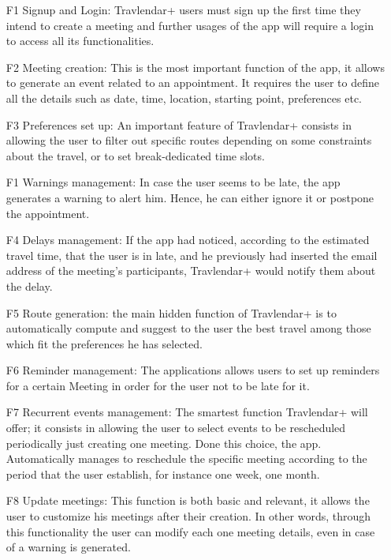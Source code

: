 
\begin{itemize}

\item[\hypertarget{F1}{F1}] Signup and Login: Travlendar+ users must sign up the first time they intend to create a meeting and further usages of the app will require a login to access all its functionalities.
\item[\hypertarget{F2}{F2}] Meeting creation: This is the most important function of the app, it allows to generate an event related to an appointment. It requires the user to define all the details such as date, time, location, starting point, preferences etc. 
\item[\hypertarget{F3}{F3}] Preferences set up: An important feature of Travlendar+ consists in allowing the user to filter out specific routes depending on some constraints about the travel, or to set break-dedicated time slots.
\item[\hypertarget{F1}{F1}] Warnings management: In case the user seems to be late, the app generates a warning to alert him. Hence, he can either ignore it or postpone the appointment.
\item[\hypertarget{F4}{F4}] Delays management:  If the app had noticed, according to the estimated travel time, that the user is in late, and he previously had inserted the email address of the meeting’s participants, Travlendar+ would notify them about the delay. 
\item[\hypertarget{F5}{F5}] Route generation: the main hidden function of Travlendar+ is to automatically compute and suggest to the user the best travel among those which fit the preferences he has selected.
\item[\hypertarget{F6}{F6}] Reminder management: The applications allows users to set up reminders for a certain Meeting in order for the user not to be late for it.

\item[\hypertarget{F7}{F7}] Recurrent events management: The smartest function Travlendar+ will offer; it consists in allowing the user to select events to be rescheduled periodically just creating one meeting. Done this choice, the app. Automatically manages to  reschedule the specific meeting according to the period that the user establish, for instance one week, one month.
\item[\hypertarget{F8}{F8}] Update meetings: This function is both basic and relevant, it allows the user to customize his meetings after their creation. In other words, through this functionality the user can modify each one meeting details, even in case of a warning is generated.


\end{itemize}

 
